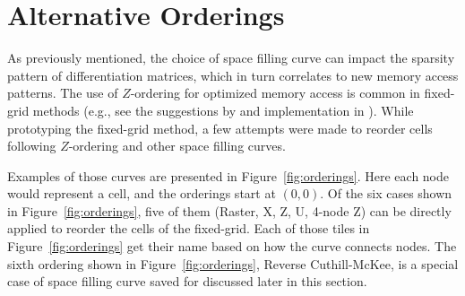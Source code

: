 \documentclass{report}
\begin{document}


%
%







\section{Alternative Orderings}


As previously mentioned, the choice of space filling curve can impact the sparsity pattern of differentiation matrices, which in turn correlates to new memory access patterns. The use of $Z$-ordering for optimized memory access is common in fixed-grid methods (e.g., see the suggestions by \cite{Johnson2011,Green2010,Krog2010} and implementation in \cite{Goswami2010}). While prototyping the fixed-grid method, a few attempts were made to reorder cells following $Z$-ordering and other space filling curves. 

Examples of those curves are presented in Figure~\ref{fig:orderings}. Here each node would represent a cell, and the orderings start at $(0,0)$. Of the six cases shown in Figure~\ref{fig:orderings}, five of them (Raster, X, Z, U, 4-node Z) can be directly applied to reorder the cells of the fixed-grid. Each of those tiles in Figure~\ref{fig:orderings} get their name based on how the curve connects nodes. The sixth ordering shown in Figure~\ref{fig:orderings}, Reverse Cuthill-McKee, is a special case of space filling curve saved for discussed later in this section. 
\end{document}
